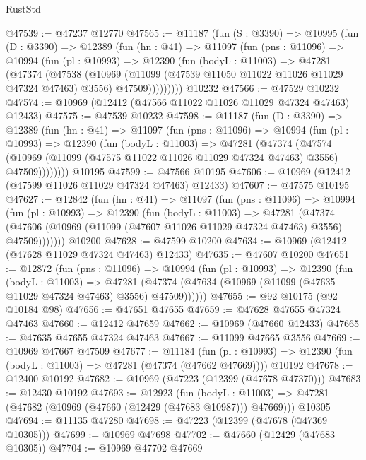 \begin{lexlean}{RustStd}
\begin{coremodule}
@47539 := @47237 @12770
@47565 := @11187
    (fun (S : @3390) =>
    @10995
      (fun (D : @3390) =>
      @12389
        (fun (hn : @41) =>
        @11097
          (fun (pns : @11096) =>
          @10994
            (fun (pl : @10993) =>
            @12390
              (fun (bodyL : @11003) =>
              @47281
                (@47374
                  (@47538
                    (@10969
                      (@11099 (@47539 @11050 @11022 @11026 @11029 @47324 @47463) @3556)
                      @47509)))))))))
    @10232
@47566 := @47529 @10232
@47574 := @10969 (@12412 (@47566 @11022 @11026 @11029 @47324 @47463) @12433)
@47575 := @47539 @10232
@47598 := @11187
    (fun (D : @3390) =>
    @12389
      (fun (hn : @41) =>
      @11097
        (fun (pns : @11096) =>
        @10994
          (fun (pl : @10993) =>
          @12390
            (fun (bodyL : @11003) =>
            @47281
              (@47374
                (@47574
                  (@10969 (@11099 (@47575 @11022 @11026 @11029 @47324 @47463) @3556) @47509))))))))
    @10195
@47599 := @47566 @10195
@47606 := @10969 (@12412 (@47599 @11026 @11029 @47324 @47463) @12433)
@47607 := @47575 @10195
@47627 := @12842
    (fun (hn : @41) =>
    @11097
      (fun (pns : @11096) =>
      @10994
        (fun (pl : @10993) =>
        @12390
          (fun (bodyL : @11003) =>
          @47281
            (@47374
              (@47606 (@10969 (@11099 (@47607 @11026 @11029 @47324 @47463) @3556) @47509)))))))
    @10200
@47628 := @47599 @10200
@47634 := @10969 (@12412 (@47628 @11029 @47324 @47463) @12433)
@47635 := @47607 @10200
@47651 := @12872
    (fun (pns : @11096) =>
    @10994
      (fun (pl : @10993) =>
      @12390
        (fun (bodyL : @11003) =>
        @47281 (@47374 (@47634 (@10969 (@11099 (@47635 @11029 @47324 @47463) @3556) @47509))))))
@47655 := @92 @10175 (@92 @10184 @98)
@47656 := @47651 @47655
@47659 := @47628 @47655 @47324 @47463
@47660 := @12412 @47659
@47662 := @10969 (@47660 @12433)
@47665 := @47635 @47655 @47324 @47463
@47667 := @11099 @47665 @3556
@47669 := @10969 @47667 @47509
@47677 := @11184
    (fun (pl : @10993) => @12390 (fun (bodyL : @11003) => @47281 (@47374 (@47662 @47669))))
    @10192
@47678 := @12400 @10192
@47682 := @10969 (@47223 (@12399 (@47678 @47370)))
@47683 := @12430 @10192
@47693 := @12923
    (fun (bodyL : @11003) => @47281 (@47682 (@10969 (@47660 (@12429 (@47683 @10987))) @47669)))
    @10305
@47694 := @11135 @47280
@47698 := @47223 (@12399 (@47678 (@47369 @10305)))
@47699 := @10969 @47698
@47702 := @47660 (@12429 (@47683 @10305))
@47704 := @10969 @47702 @47669

\end{coremodule}
\end{lexlean}
